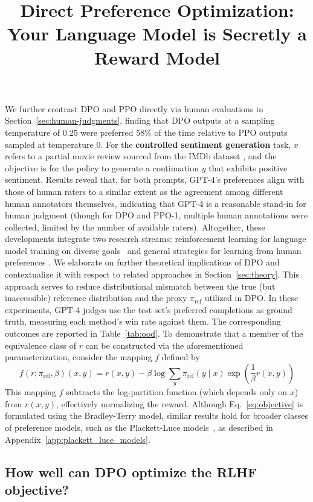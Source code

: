 \title{Direct Preference Optimization: Your Language Model is Secretly a Reward Model}
We further contrast DPO and PPO directly via human evaluations in Section~\ref{sec:human-judgments}, finding that DPO outputs at a sampling temperature of 0.25 were preferred 58\% of the time relative to PPO outputs sampled at temperature 0. For the \textbf{controlled sentiment generation} task, $x$ refers to a partial movie review sourced from the IMDb dataset \cite{maas-EtAl:2011:ACL-HLT2011}, and the objective is for the policy to generate a continuation $y$ that exhibits positive sentiment. Results reveal that, for both prompts, GPT-4’s preferences align with those of human raters to a similar extent as the agreement among different human annotators themselves, indicating that GPT-4 is a reasonable stand-in for human judgment (though for DPO and PPO-1, multiple human annotations were collected, limited by the number of available raters). Altogether, these developments integrate two research streams: reinforcement learning for language model training on diverse goals~\citep{Ranzato2015SequenceLT,paulus2018a,wu2018learning} and general strategies for learning from human preferences \citep{christiano2017deep,kupcsik2018learning}. We elaborate on further theoretical implications of DPO and contextualize it with respect to related approaches in Section~\ref{sec:theory}. This approach serves to reduce distributional mismatch between the true (but inaccessible) reference distribution and the proxy $\pi_\text{ref}$ utilized in DPO. In these experiments, GPT-4 judges use the test set's preferred completions as ground truth, measuring each method's win rate against them. The corresponding outcomes are reported in Table~\ref{tab:ood}. To demonstrate that a member of the equivalence class of $r$ can be constructed via the aforementioned parameterization, consider the mapping $f$ defined by  
\begin{equation}
    f(r; \pi_\text{ref}, \beta)(x, y) = r(x, y) - \beta\log\sum_{y}\pi_\text{ref}(y\mid x)\exp\left(\frac{1}{\beta}r(x, y)\right)
\end{equation}
This mapping $f$ subtracts the log-partition function (which depends only on $x$) from $r(x, y)$, effectively normalizing the reward. Although Eq.~\ref{eq:objective} is formulated using the Bradley-Terry model, similar results hold for broader classes of preference models, such as the Plackett-Luce models~\citep{plackett1975analysis, luce2012individual}, as described in Appendix~\ref{app:plackett_luce_models}.  \subsection{How well can DPO optimize the RLHF objective?}

